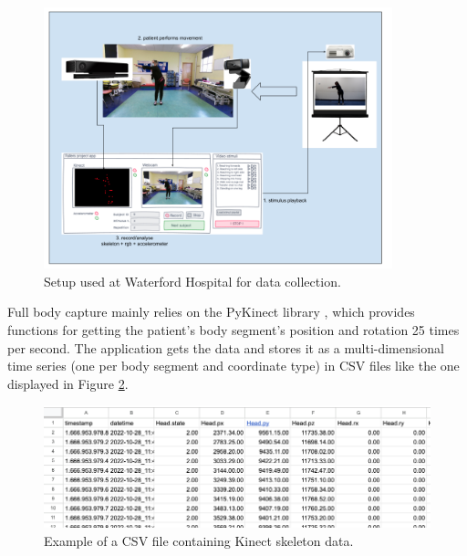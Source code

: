                     \begin{figure}[H]
                        \centering
                        \includegraphics[width=0.9\textwidth]{./resources/images/kinect/setup.png}
                        \caption{Setup used at Waterford Hospital for data collection.}
                        \label{fig:kinect_setup}
                    \end{figure}

                    Full body capture mainly relies on the PyKinect library \cite{GitHubKinectPyKinect2}, which provides functions for getting the patient's body segment's position and rotation 25 times per second. The application gets the data and stores it as a multi-dimensional time series (one per body segment and coordinate type) in CSV files like the one displayed in Figure \ref{fig:csv_structure}.
                    \newpage
                    \begin{figure}[H]
                        \centering
                        \includegraphics[width=1.0\textwidth]{./resources/images/other/data.png}
                        \caption{Example of a CSV file containing Kinect skeleton data.}
                        \label{fig:csv_structure}
                    \end{figure}


